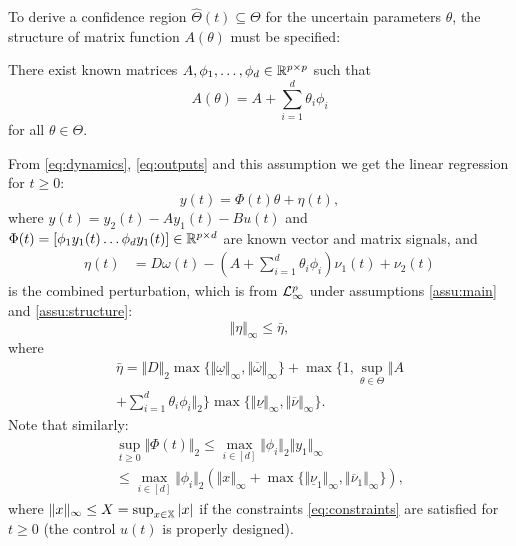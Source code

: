 \documentclass[letterpaper, 10 pt, conference]{ieeeconf}  %
\begin{document}
To derive a confidence region $\hat{\Theta}(t)\subseteq\Theta$ for
the uncertain parameters $\theta$, the structure of matrix function
$A(\theta)$ must be specified:
\begin{assumption}
\label{assu:structure} There exist known matrices $A,\phi_{1},\dots,\phi_{d}\in\mathbb{R}^{p\times p}$
such that 
\[
A(\theta)=A+\sum_{i=1}^{d}\theta_{i}\phi_{i}
\]
for all $\theta\in\Theta$. 
\end{assumption}
From \eqref{eq:dynamics}, \eqref{eq:outputs} and this assumption
we get the linear regression for $t\geq0$:
\begin{equation}
y(t)=\Phi(t)\theta+\eta(t),\label{eq:lin_regr}
\end{equation}
where $y(t)=y_{2}(t)-Ay_{1}(t)-Bu(t)$ and $\Phi(t)=[\phi_{1}y_{1}(t)\dots\phi_{d}y_{1}(t)]\in\mathbb{R}^{p\times d}$
are known vector and matrix signals, and
\begin{align*}
\eta(t) & =D\omega(t)-\left(A+\sum_{i=1}^{d}\theta_{i}\phi_{i}\right)\nu_{1}(t)+\nu_{2}(t)
\end{align*}
is the combined perturbation, which is from $\mathcal{L}_{\infty}^{p}$ under
assumptions \ref{assu:main} and \ref{assu:structure}:
\[
\Vert\eta\Vert_{\infty}\leq\bar{\eta},
\]
where
\begin{gather*}
\bar{\eta}=\Vert D\Vert_{2}\max\{\Vert\underline{\omega}\Vert_{\infty},\Vert\overline{\omega}\Vert_{\infty}\}+\max\{1,\sup_{\theta\in\Theta}\Vert A\\
+\sum_{i=1}^{d}\theta_{i}\phi_{i}\Vert_{2}\}\max\{\Vert\underline{\nu}\Vert_{\infty},\Vert\overline{\nu}\Vert_{\infty}\}.
\end{gather*}
Note that similarly:
\begin{gather*}
\sup_{t\geq0}\Vert\Phi(t)\Vert_{2}\leq\max_{i\in[d]}\Vert\phi_{i}\Vert_{2}\Vert y_{1}\Vert_{\infty}\\
\leq\max_{i\in[d]}\Vert\phi_{i}\Vert_{2}(\Vert x\Vert_{\infty}+\max\{\Vert\underline{\nu}_{1}\Vert_{\infty},\Vert\overline{\nu}_{1}\Vert_{\infty}\}),
\end{gather*}
where $\Vert x\Vert_{\infty}\leq X=\sup_{x\in\mathbb{X}}|x|$ if the constraints
\eqref{eq:constraints} are satisfied for $t\geq0$ (the control $u(t)$
is properly designed). 
\end{document}
